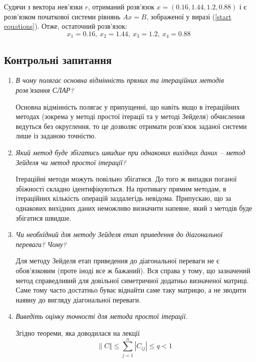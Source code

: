 \documentclass[a4paper,14pt]{extarticle} %
\begin{document}
Судячи з вектора нев'язки $r$, отриманий розв'язок $x=(0.16, 1.44, 1.2, 0.88)$ і є розв'язком 
початкової системи рівнянь $Ax=B$, зображеної у виразі (\ref{start equations}).
Отже, остаточний розв'язок: \[ x_1=0.16,\ x_2=1.44,\ x_3=1.2,\ x_4=0.88 \]

\newpage
\subsection*{Контрольні запитання}

\begin{enumerate}
    \item \textit{В чому полягає основна відмінність прямих та ітераційних методів розв’я\-зання СЛАР?}

    Основна відмінність полягає у припущенні, що навіть якщо в ітераційних методах (зокрема у методі простої 
    ітерації та у методі Зейделя) обчислення ведуться без округлення, то це дозволяє отримати розв'язок 
    заданої системи лише із заданою точністю.

    \item \textit{Який метод буде збігатись швидше при однакових вихідних даних – метод Зейделя чи
    метод простої ітерації?}

    Ітераційні методи можуть повільно збігатися. До того ж випадки поганої збіжності складно ідентифікуються. 
    На противагу прямим методам, в ітераційних кількість операцій заздалегідь невідома. Припускаю, що за 
    однакових вихідних даних неможливо визначити напевне, який з методів буде збігатися швидше.  

    \item \textit{Чи необхідний для методу Зейделя етап приведення до діагональної переваги? Чому?}
    
    Для методу Зейделя етап приведення до діагональної переваги не є обов'язко\-вим (проте іноді все ж бажаний). 
    Вся справа у тому, що зазначений метод справедливий для довільної симетричної додатньо визначеної матриці. Саме тому 
    часто достатньо буває віднайти саме таку матрицю, а не зводити наявну до вигляду діагональної переваги.

    \item \textit{Виведіть оцінку точності для метода простої ітерації.}

    Згідно теореми, яка доводилася на лекції
    \begin{equation}
        \|C\Vert \leqslant \sum\limits_{j=1}^n |C_{ij}| \leqslant q < 1 \label{||C||}
    \end{equation}


\end{enumerate}
\end{document}
